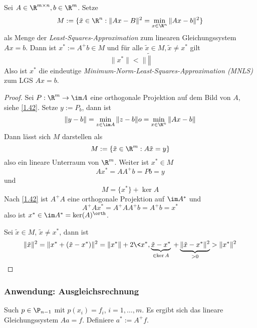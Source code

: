 \documentclass[a4paper,11pt]{scrartcl}
\begin{document}
\begin{st}
	\label{1.43}
	Sei $A\in \R^{m\times n}, b\in \R^m$.
	Setze
	\[
		M := \{ \tilde x\in \R^n : \|Ax-B\|^2 = \min_{x\in \R^n}\|Ax-b\|^2\}
	\]
	als Menge der \emph{Least-Squares-Approximation} zum linearen Gleichungssystem $Ax=b$.
	Dann ist $x^* := A^+b \in M$ und für alle $\tilde x\in M, \tilde x \neq x^*$ gilt
	\[
		\|x^*\| < \| \tilde \|
	\]
	Also ist $x^*$ die eindeutige \emph{Minimum-Norm-Least-Squares-Approximation (MNLS)} zum LGS $Ax=b$.
	\begin{proof}
		Sei $P: \R^m \to \im A$ eine orthogonale Projektion auf dem Bild von $A$, siehe \ref{1.42}.
		Setze $y:= P_b$, dann ist
		\[
			\|y-b\| = \min_{z\in \im A}\|z-b\|o = \min_{x\in \R^n}\|Ax-b\|
		\]
		Dann lässt sich $M$ darstellen als
		\[
			M := \{ \tilde x \in \R^m : A\tilde x = y\}
		\]
		also ein lineare Unterraum von $\R^m$.
		Weiter ist $x^* \in M$
		\[
			Ax^* = AA^+ b = Pb = y
		\]
		und
		\[
			M = \{x^*\} + \ker A
		\]
		Nach \ref{1.42} ist $A^+A$ eine orthogonale Projektion auf $\im A^*$ und 
		\[
			A^+Ax^* = A^+AA^+ b = A^+b = x^*
		\]
		also ist $x^* \in \im A^* = \ker( A)^\orth$.

		Sei $\tilde x \in M$, $\tilde x \neq x^*$, dann ist
		\[
			\|\tilde x\|^2 = \|x^* + (\tilde x - x^*)\|^2 = \|x^*\| + 2\< x^*,\underbrace{\tilde x - x^*}_{\in \ker A}\> + \underbrace{\|\tilde x - x^*\|^2}_{>0} > \|x^*\|^2
		\]
	\end{proof}
\end{st}

\subsubsection{Anwendung: Ausgleichsrechnung}

Such $p\in \P_{n-1}$ mit $p(x_i)=f_i$, $i=1,\dotsc,m$.
Es ergibt sich das lineare Gleichungssystem $Aa = f$.
Definiere $a^* := A^+f$.
\end{document}

